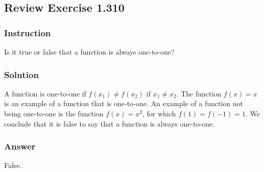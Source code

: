 \subsection*{Review Exercise 1.310}

\subsubsection*{Instruction}

Is it true or false that a function is always one-to-one?

\subsubsection*{Solution}

A function is one-to-one if $ f(x_1) \ne f(x_2) $ if  $ x_1 \ne x_2 $. The function $ f(x) = x $ is an example of a function that is one-to-one. An example of a function not being one-to-one is the function $ f(x) = x^2 $, for which $ f(1) = f(-1) = 1 $. We conclude that it is false to say that a function is always one-to-one.

\subsubsection*{Answer}

False.
